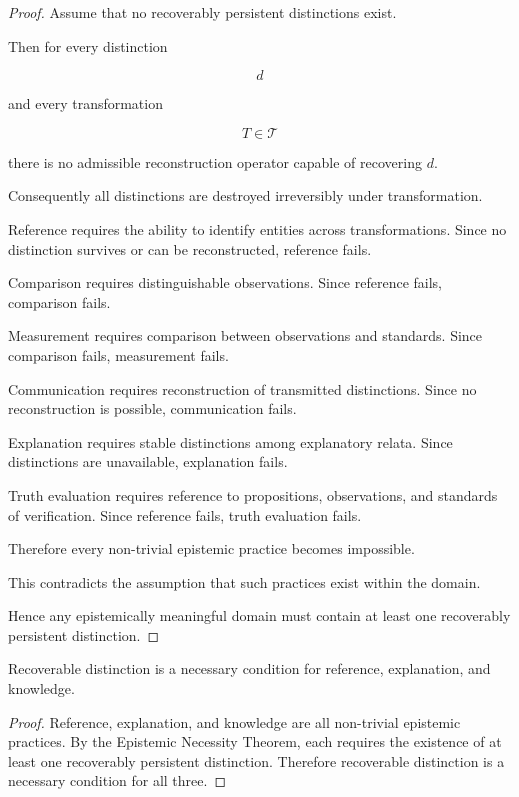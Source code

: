 \documentclass[12pt,oneside]{article}
\theoremstyle{definition}
\begin{document}
\begin{proof}

Assume that no recoverably persistent distinctions exist.

Then for every distinction

\[
d
\]

and every transformation

\[
T\in\mathcal{T}
\]

there is no admissible reconstruction operator capable of recovering \(d\).

Consequently all distinctions are destroyed irreversibly under transformation.

Reference requires the ability to identify entities across transformations. Since no distinction survives or can be reconstructed, reference fails.

Comparison requires distinguishable observations. Since reference fails, comparison fails.

Measurement requires comparison between observations and standards. Since comparison fails, measurement fails.

Communication requires reconstruction of transmitted distinctions. Since no reconstruction is possible, communication fails.

Explanation requires stable distinctions among explanatory relata. Since distinctions are unavailable, explanation fails.

Truth evaluation requires reference to propositions, observations, and standards of verification. Since reference fails, truth evaluation fails.

Therefore every non-trivial epistemic practice becomes impossible.

This contradicts the assumption that such practices exist within the domain.

Hence any epistemically meaningful domain must contain at least one recoverably persistent distinction.

\end{proof}

\begin{corollary}

Recoverable distinction is a necessary condition for reference, explanation, and knowledge.

\end{corollary}

\begin{proof}

Reference, explanation, and knowledge are all non-trivial epistemic practices. By the Epistemic Necessity Theorem, each requires the existence of at least one recoverably persistent distinction. Therefore recoverable distinction is a necessary condition for all three.

\end{proof}
\end{document}
